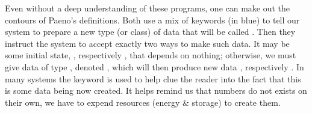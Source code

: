 Even without a deep understanding of these programs, one can make out the
contours of Paeno's definitions.  Both use a mix of keywords (in blue) to tell
our system to prepare a new type (or class) of data that will be called
.  Then they instruct the system to accept exactly two ways to make
such data. It may be some initial state, , respectively ,
that depends on nothing; otherwise, we must give data  of type
, denoted , which will then produce new data ,
respectively .  In many systems the keyword  is 
used to help clue the reader into the fact that this is some data being now 
created.  It helps remind us that numbers do not  exists on their own, 
we have to expend resources (energy \& storage) to create them. 

